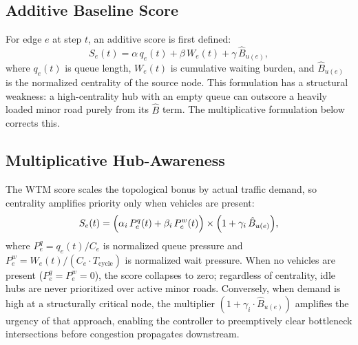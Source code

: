 \documentclass[letterpaper, conference]{IEEEtran}
\begin{document}
\subsection{Additive Baseline Score}
For edge $e$ at step $t$, an additive score is first defined:
\begin{equation}
S_e(t) = \alpha\, q_e(t) + \beta\, W_e(t) + \gamma\,\hat{B}_{u(e)}, \label{eq:additive_score}
\end{equation}
where $q_e(t)$ is queue length, $W_e(t)$ is cumulative waiting burden, and $\hat{B}_{u(e)}$ is the normalized centrality of the source node. This formulation has a structural weakness: a high-centrality hub with an empty queue can outscore a heavily loaded minor road purely from its $\hat{B}$ term. The multiplicative formulation below corrects this.

\subsection{Multiplicative Hub-Awareness}
The WTM score scales the topological bonus by actual traffic demand, so centrality amplifies priority only when vehicles are present:
\begin{equation}
S_e(t) = \Bigl(\alpha_i\,P_e^{q}(t)+\beta_i\,P_e^{w}(t)\Bigr)\times\Bigl(1+\gamma_i\,\hat{B}_{u(e)}\Bigr), \label{eq:mult_score}
\end{equation}
where $P_e^{q}=q_e(t)/C_e$ is normalized queue pressure and $P_e^{w}=W_e(t)/(C_e\cdot T_{\mathrm{cycle}})$ is normalized wait pressure. When no vehicles are present ($P_e^q{=}P_e^w{=}0$), the score collapses to zero; regardless of centrality, idle hubs are never prioritized over active minor roads. Conversely, when demand is high at a structurally critical node, the multiplier $(1 + \gamma_i \cdot \hat{B}_{u(e)})$ amplifies the urgency of that approach, enabling the controller to preemptively clear bottleneck intersections before congestion propagates downstream.
\end{document}

